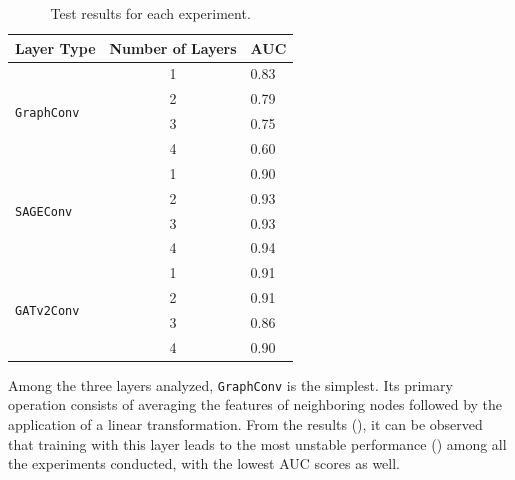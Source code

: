 \documentclass[11pt]{article}
\begin{document}
\begin{table}
  \centering
  \begin{tabular}{|l|c|l|} 
  \hline
  \textbf{Layer Type}                  & \multicolumn{1}{l|}{\textbf{Number of Layers}} & \textbf{AUC}  \\ 
  \hline
  \multirow{4}{*}{\texttt{GraphConv }} & 1                                              & 0.83          \\ 
  \cline{2-3}
                                       & 2                                              & 0.79          \\ 
  \cline{2-3}
                                       & 3                                              & 0.75          \\ 
  \cline{2-3}
                                       & 4                                              & 0.60          \\ 
  \hline
  \multirow{4}{*}{\texttt{SAGEConv}}   & 1                                              & 0.90          \\ 
  \cline{2-3}
                                       & 2                                              & 0.93          \\ 
  \cline{2-3}
                                       & 3                                              & 0.93          \\ 
  \cline{2-3}
                                       & 4                                              & 0.94          \\ 
  \hline
  \multirow{4}{*}{\texttt{GATv2Conv}}  & 1                                              & 0.91          \\ 
  \cline{2-3}
                                       & 2                                              & 0.91          \\ 
  \cline{2-3}
                                       & 3                                              & 0.86          \\ 
  \cline{2-3}
                                       & 4                                              & 0.90          \\
  \hline
  \end{tabular}

  \caption{Test results for each experiment.}
  \label{tab:results}
\end{table}


Among the three layers analyzed, \texttt{GraphConv} is the simplest. 
%
Its primary operation consists of averaging the features of neighboring nodes followed by the application of a linear transformation. 
%
From the results (), it can be observed that training with this layer leads to the most unstable performance () among all 
%
the experiments conducted, with the lowest AUC scores as well.
\end{document}
